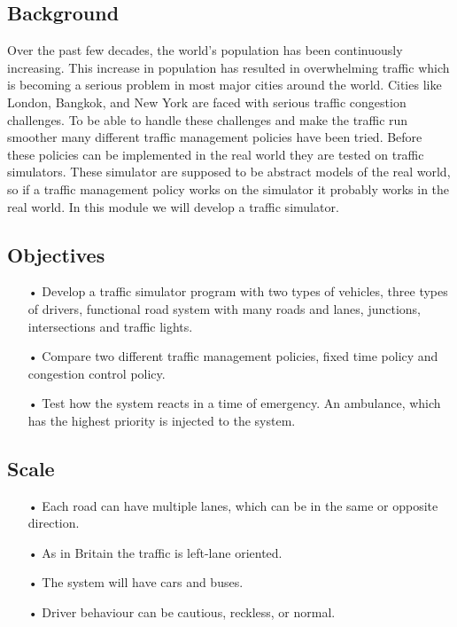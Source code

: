 \documentclass[11pt]{article}
\begin{document}
\subsection{Background}
Over the past few decades, the world's population has been continuously increasing. This increase in population has resulted in overwhelming traffic which is becoming a serious problem in most major cities around the world. Cities like London, Bangkok, and New York are faced with serious traffic congestion challenges. To be able to handle these challenges and make the traffic run smoother many different traffic management policies have been tried. Before these policies can be implemented in the real world they are tested on traffic simulators. These simulator are supposed to be abstract models of the real world, so if a traffic management policy works on the simulator it probably works in the real world. In this module we will develop a traffic simulator.


\subsection{Objectives}
\begin{itemize}
\item[•] Develop a traffic simulator program with two types of vehicles, three types of drivers, functional road system with many roads and lanes, junctions, intersections and traffic lights.
\item[•] Compare two different traffic management policies, fixed time policy and congestion control policy.
\item[•] Test how the system reacts in a time of emergency. An ambulance, which has the highest priority is injected to the system.
\end{itemize}

\subsection{Scale}
\begin{itemize}
\item[•] Each road can have multiple lanes, which can be in the same or opposite direction.
\item[•] As in Britain the traffic is left-lane oriented.
\item[•] The system will have cars and buses.
\item[•] Driver behaviour can be cautious, reckless, or normal.
\end{itemize}
\end{document}

